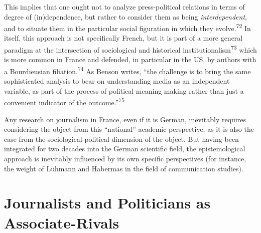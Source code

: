 \documentclass{tufte-handout}
\begin{document}
This implies that one ought not to analyze press-political relations in
terms of degree of (in)dependence, but rather to consider them as being
\emph{interdependent}, and to situate them in the particular social
figuration in which they evolve.\textsuperscript{72} In
itself, this approach is not specifically French, but it is part of a
more general paradigm at the intersection of sociological and historical
institutionalism\textsuperscript{73} which is more common in
France and defended, in particular in the US, by authors with a
Bourdieusian filiation.\textsuperscript{74} As Benson writes, ``the challenge is to bring the same
sophisticated analysis to bear on understanding media as an independent
variable, as part of the process of political meaning making rather than
just a convenient indicator of the outcome.''\textsuperscript{75}

Any research on journalism in France, even if it is German, inevitably
requires considering the object from this ``national'' academic
perspective, as it is also the case from the sociological-political
dimension of the object. But having been integrated for two decades into
the German scientific field, the epistemological approach is inevitably
influenced by its own specific perspectives (for instance, the weight of
Luhmann and Habermas in the field of communication studies).

\hypertarget{journalists-and-politicians-as-associate-rivals}{%
\section{Journalists and Politicians as
Associate-Rivals}\label{journalists-and-politicians-as-associate-rivals}}
\end{document}
